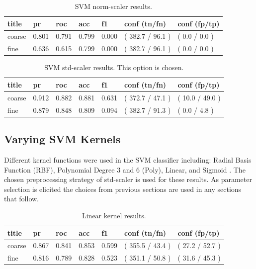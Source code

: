 \documentclass[ms]{nuthesis}
\begin{document}
\FloatBarrier
\begin{table}[H]
\centering
\begin{tabular}{|l||l||l||l||l||l||l|}\toprule
title & pr & roc & acc & f1 & conf (tn/fn) & conf (fp/tp) \\ \midrule
coarse & 0.801 & 0.791 & 0.799 & 0.000 & ( 382.7 / 96.1 ) & ( 0.0 / 0.0 ) \\
fine & 0.636 & 0.615 & 0.799 & 0.000 & ( 382.7 / 96.1 ) & ( 0.0 / 0.0 ) \\ \bottomrule
\end{tabular}
\caption{SVM norm-scaler results.}
\label{tab:SVMNorm}
\end{table}
\FloatBarrier

\FloatBarrier
\begin{table}[H]
\centering
\begin{tabular}{|l||l||l||l||l||l||l|}\toprule
title & pr & roc & acc & f1 & conf (tn/fn) & conf (fp/tp) \\ \midrule
coarse & 0.912 & 0.882 & 0.881 & 0.631 & ( 372.7 / 47.1 ) & ( 10.0 / 49.0 ) \\
fine & 0.879 & 0.848 & 0.809 & 0.094 & ( 382.7 / 91.3 ) & ( 0.0 / 4.8 ) \\ \bottomrule
\end{tabular}
\caption{SVM std-scaler results. This option is chosen.}
\label{tab:SVMStandard}
\end{table}
\FloatBarrier


\subsection{Varying SVM Kernels}
\par Different kernel functions were used in the SVM classifier including: Radial Basis Function (RBF), Polynomial
Degree 3 and 6 (Poly), Linear, and Sigmoid \cite{scikit-learn}. The chosen preprocessing strategy of
std-scaler is used for these results. As parameter selection is elicited the choices from previous sections
are used in any sections that follow.



\FloatBarrier
\begin{table}[H]
\centering
\begin{tabular}{|l||l||l||l||l||l||l|}\toprule
title & pr & roc & acc & f1 & conf (tn/fn) & conf (fp/tp) \\ \midrule
coarse & 0.867 & 0.841 & 0.853 & 0.599 & ( 355.5 / 43.4 ) & ( 27.2 / 52.7 ) \\
fine & 0.816 & 0.789 & 0.828 & 0.523 & ( 351.1 / 50.8 ) & ( 31.6 / 45.3 ) \\ \bottomrule
\end{tabular}
\caption{Linear kernel results.}
\label{tab:Linear}
\end{table}
\FloatBarrier
\end{document}
